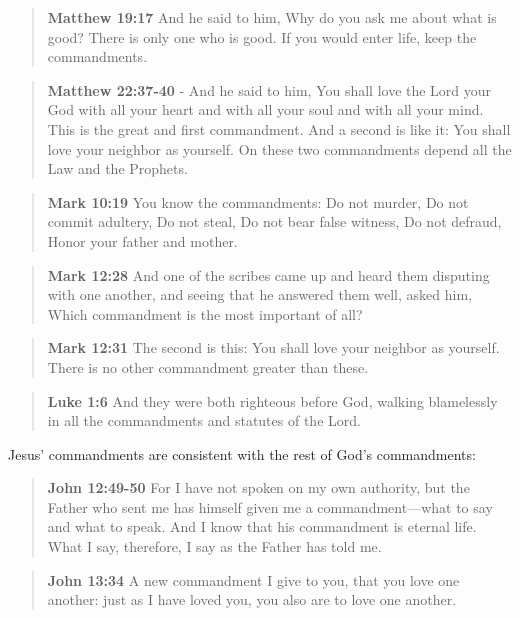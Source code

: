 \documentclass[11pt]{article}
\begin{document}
\begin{quote}
\textbf{Matthew 19:17} And he said to him, Why do you ask me about what is good? There is only one who is good. If you would enter life, keep the commandments.
\end{quote}

\begin{quote}
\textbf{Matthew 22:37-40} - And he said to him, You shall love the Lord your God with all your heart and with all your soul and with all your mind. This is the great and first commandment. And a second is like it: You shall love your neighbor as yourself. On these two commandments depend all the Law and the Prophets.
\end{quote}

\begin{quote}
\textbf{Mark 10:19} You know the commandments: Do not murder, Do not commit adultery, Do not steal, Do not bear false witness, Do not defraud, Honor your father and mother.
\end{quote}

\begin{quote}
\textbf{Mark 12:28} And one of the scribes came up and heard them disputing with one another, and seeing that he answered them well, asked him, Which commandment is the most important of all?
\end{quote}

\begin{quote}
\textbf{Mark 12:31} The second is this: You shall love your neighbor as yourself. There is no other commandment greater than these.
\end{quote}

\begin{quote}
\textbf{Luke 1:6} And they were both righteous before God, walking blamelessly in all the commandments and statutes of the Lord.
\end{quote}

Jesus' commandments are consistent with the rest of God's commandments:

\begin{quote}
\textbf{John 12:49-50} For I have not spoken on my own authority, but the Father who sent me has himself given me a commandment—what to say and what to speak. And I know that his commandment is eternal life. What I say, therefore, I say as the Father has told me.
\end{quote}

\begin{quote}
\textbf{John 13:34} A new commandment I give to you, that you love one another: just as I have loved you, you also are to love one another.
\end{quote}
\end{document}
